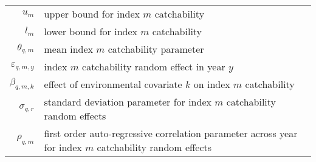 \begin{longtable}[c]{r p{}}
$u_{m}$ & upper bound for index $m$ catchability\\
$l_{m}$ & lower bound for index $m$ catchability\\
$\theta_{q,m}$ & mean index $m$ catchability parameter\\
$\varepsilon_{q,m,y}$ & index $m$ catchability random effect in year $y$\\
$\beta_{q,m,k}$ & effect of environmental covariate $k$ on index $m$ catchability\\
$\sigma_{q,r}$ & standard deviation parameter for index $m$ catchability random effects\\
$\rho_{q,m}$ & first order auto-regressive correlation parameter across year for index $m$ catchability random effects\\
\end{longtable}
